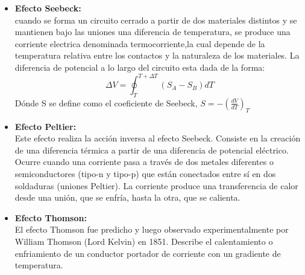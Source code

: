 \begin{itemize}
    \item \textbf{Efecto Seebeck:}\\ cuando se forma un circuito
cerrado a partir de dos materiales distintos y se mantienen bajo las uniones una diferencia de temperatura, se produce una corriente electrica denominada termocorriente,la cual depende de la temperatura relativa entre los contactos y la naturaleza de los materiales. La diferencia de potencial a lo largo del circuito esta dada de la forma:
\begin{equation*}
    \Delta V = \oint_T^{T+\Delta T} (S_A-S_B)dT
\end{equation*}
Dónde S se define como el coeficiente de Seebeck, $S=-(\frac{dV}{dT})_T$
\item \textbf{Efecto Peltier:}\\ Este efecto realiza la acción inversa al efecto Seebeck. Consiste en la creación de una diferencia
térmica a partir de una diferencia de potencial eléctrico. Ocurre cuando una corriente pasa a través de dos metales diferentes o semiconductores (tipo-n y tipo-p) que están conectados entre sí
en dos soldaduras (uniones Peltier). La corriente produce una transferencia de calor desde una unión, que se enfría, hasta la otra, que se calienta.
\item \textbf{Efecto Thomson:}\\ El efecto Thomson fue predicho y luego observado experimentalmente por William Thomson (Lord Kelvin) en 1851. Describe el calentamiento o enfriamiento de un conductor portador de corriente con un gradiente de temperatura.

\end{itemize}